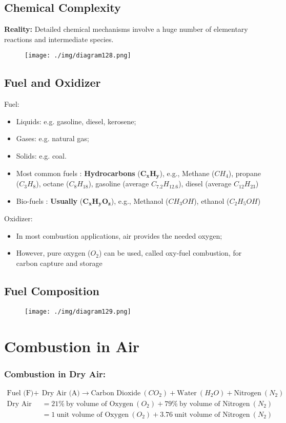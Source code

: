 \subsection{Chemical Complexity}
\textbf{Reality:} Detailed chemical mechanisms involve a huge number of elementary reactions and intermediate species.
\begin{figure}[H]
  \centering
  \texttt{[image: ./img/diagram128.png]}
  \caption{}
\end{figure}
\subsection{Fuel and Oxidizer}
Fuel:
\begin{itemize}[noitemsep]
  \item Liquids: e.g. gasoline, diesel, kerosene;
  \item Gases: e.g. natural gas;
  \item Solids: e.g. coal.
  \item Most common fuels : \textbf{Hydrocarbons} ($\mathbf{C_xH_y}$), e.g., Methane ($CH_4$), propane ($C_3H_8$), octane ($C_8H_{18}$), gasoline (average $C_{7.2}H_{12.6}$), diesel (average $C_{12}H_{23}$)
  \item Bio-fuels : \textbf{Usually} ($\mathbf{C_xH_yO_z}$), e.g., Methanol ($CH_3OH$), ethanol ($C_2H_5OH$)
\end{itemize}
Oxidizer:
\begin{itemize}[noitemsep]
  \item In most combustion applications, air provides the needed oxygen;
  \item However, pure oxygen ($O_2$) can be used, called oxy-fuel combustion, for carbon capture and storage
\end{itemize}
\subsection{Fuel Composition}
\begin{figure}[H]
  \centering
  \texttt{[image: ./img/diagram129.png]}
  \caption{}
\end{figure}
\section{Combustion in Air}
\subsubsection{Combustion in Dry Air:}
\begin{align*}
  \text{Fuel (F)} +  & \text{Dry Air (A)} \longrightarrow \text{Carbon Dioxide} \ (CO_2) + \text{Water} \ (H_2O) + \text{Nitrogen} \ (N_2) \\[5pt]
  \text{Dry Air (A)} & = 21\% \ \text{by volume of Oxygen} \ (O_2) + 79\% \ \text{by volume of Nitrogen} \ (N_2)                           \\[5pt]
                     & = 1 \ \text{unit volume of Oxygen} \ (O_2) + 3.76 \ \text{unit volume of Nitrogen} \ (N_2)
\end{align*}
